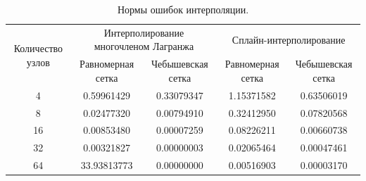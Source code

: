 \documentclass[12pt, a4paper]{article}
\begin{document}
	\begin{table}[H]
		\caption{Нормы ошибок интерполяции.}
		\centering
		\footnotesize
		\begin{tabular}{|c|c|c|c|c|}
			\hline
			\multirow{2}{5em}{Количество узлов} & \multicolumn{2}{|c|}{Интерполирование многочленом Лагранжа}&\multicolumn{2}{|c|}{Сплайн-интерполирование}\\
			\cline{2-5}
			&Равномерная сетка &Чебышевская сетка &Равномерная сетка&Чебышевская сетка\\
			\hline
			4&0.59961429&0.33079347&1.15371582&0.63506019\\
			\hline
			8&0.02477320&0.00794910&0.32412950&0.07820568\\
			\hline
			16&0.00853480&0.00007259&0.08226211&0.00660738\\
			\hline
			32&0.00321827&0.00000003&0.02065464&0.00047461\\
			\hline
			64&33.93813773&0.00000000&0.00516903&0.00003170\\
			\hline
		\end{tabular}
	\end{table}
	
\end{document}
